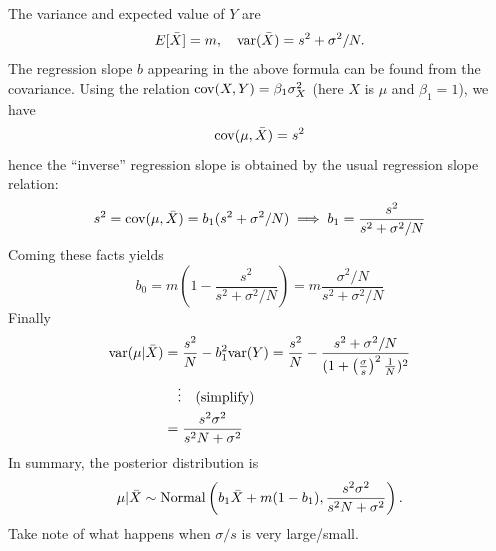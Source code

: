 The variance and expected value of $Y$ are
\begin{equation}
E[\bar{X}] = m,\quad {\rm var}(\bar{X}) = s^2 + \sigma^2/N. 
\end{equation} 
The regression slope $b$ appearing in the above formula can be found from the covariance. Using the relation ${\rm cov}(X,Y) = \beta_1 \sigma_X^2$ (here $X$ is $\mu$ and $\beta_1=1$), we have
\begin{equation}
{\rm cov}(\mu,\bar{X}) = s^2
\end{equation}
hence the ``inverse'' regression slope is obtained by the usual regression slope relation: 
\begin{equation}
s^2 = {\rm cov}(\mu,\bar{X}) = b_1(s^2 + \sigma^2/N) \implies b_1= \frac{s^2}{s^2 +\sigma^2/N}
\end{equation}
Coming these facts yields 
\begin{equation}
b_0 = m\left(1 -  \frac{s^2}{s^2 +\sigma^2/N}\right) = m \frac{\sigma^2/N}{s^2 +\sigma^2/N}
\end{equation}
Finally 
\begin{align*}
{\rm var}(\mu|\bar{X}) &= \frac{s^2}{N}  - b_1^2 {\rm var}(Y) = \frac{s^2}{N} -  \frac{ s^2 + \sigma^2/N}{(1 + \left(\frac{\sigma}{s}\right)^2\frac{1}{N})^2}\\
&\quad \vdots \quad (\text{simplify})\\
&= \frac{s^2\sigma^2}{s^2N + \sigma^2}
\end{align*}
In summary, the posterior distribution is 
\begin{equation}
\mu|\bar{X} \sim {\rm Normal}\left(b_1\bar{X} +m (1-b_1), \frac{s^2\sigma^2}{s^2N + \sigma^2}\right).
\end{equation}
Take note of what happens when $\sigma/s$ is very large/small. 


 

